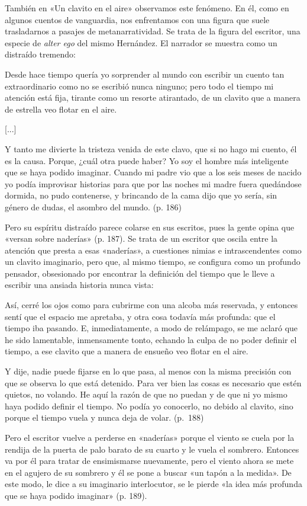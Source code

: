 \documentclass[14pt,twoside,final]{extbook} %
\begin{document}
También en «Un clavito en el aire» observamos este fenómeno. En él, como en algunos cuentos de vanguardia, nos enfrentamos con una figura que suele trasladarnos a pasajes de metanarratividad. Se trata de la figura del escritor, una especie de \emph{alter ego} del mismo Hernández. El narrador se muestra como un distraído tremendo:
\begin{quoting}
Desde hace tiempo quería yo sorprender al mundo con escribir un cuento tan extraordinario como no se escribió nunca ninguno; pero todo el tiempo mi atención está fija, tirante como un resorte atirantado, de un clavito que a manera de estrella veo flotar en el aire. 

\centerline{[...]}

Y tanto me divierte la tristeza venida de este clavo, que si no hago mi cuento, él es la causa. Porque, ¿cuál otra puede haber? Yo soy el hombre más inteligente que se haya podido imaginar. Cuando mi padre vio que a los seis meses de nacido yo podía improvisar historias para que por las noches mi madre fuera quedándose dormida, no pudo contenerse, y brincando de la cama dijo que yo sería, sin género de dudas, el asombro del mundo. (p. 186)
\end{quoting}
Pero su espíritu distraído parece colarse en sus escritos, pues la gente opina que «versan sobre naderías» (p. 187). Se trata de un escritor que oscila entre la atención que presta a esas «naderías», a cuestiones nimias e intrascendentes como un clavito imaginario, pero que, al mismo tiempo, se configura como un profundo pensador, obsesionado por encontrar la definición del tiempo que le lleve a escribir una ansiada historia nunca vista:
\begin{quoting}
Así, cerré los ojos como para cubrirme con una alcoba más reservada, y entonces sentí que el espacio me apretaba, y otra cosa todavía más profunda: que el tiempo iba pasando. E, inmediatamente, a modo de relámpago, se me aclaró que he sido lamentable, inmensamente tonto, echando la culpa de no poder definir el tiempo, a ese clavito que a manera de ensueño veo flotar en el aire.

Y dije, nadie puede fijarse en lo que pasa, al menos con la misma precisión con que se observa lo que está detenido. Para ver bien las cosas es necesario que estén quietos, no volando. He aquí la razón de que no puedan y de que ni yo mismo haya podido definir el tiempo. No podía yo conocerlo, no debido al clavito, sino porque el tiempo vuela y nunca deja de volar. (p.~188)
\end{quoting}
Pero el escritor vuelve a perderse en «naderías» porque el viento se cuela por la rendija de la puerta de palo barato de su cuarto y le vuela el sombrero. Entonces va por él para tratar de ensimismarse nuevamente, pero el viento ahora se mete en el agujero de su sombrero y él se pone a buscar «un tapón a la medida». De este modo, le dice a su imaginario interlocutor, se le pierde «la idea más profunda que se haya podido imaginar» (p. 189).
\end{document}
